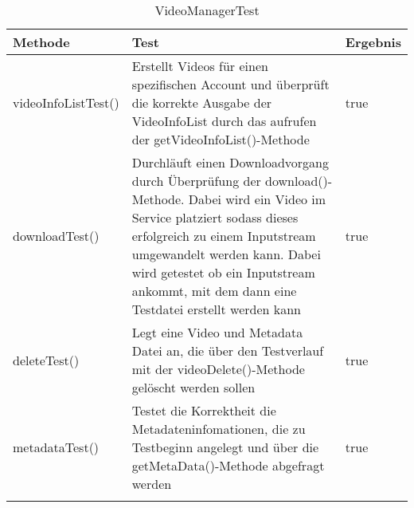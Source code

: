  \begin{longtable}{p{} | p{} | p{}}
\hline
  \textbf{Methode} & \textbf{Test} & \textbf{Ergebnis}\\
  \hline
  videoInfoListTest() & Erstellt Videos für einen spezifischen Account und überprüft die korrekte Ausgabe der VideoInfoList durch das aufrufen der getVideoInfoList()-Methode & true \\
  \hline
  downloadTest() & Durchläuft einen Downloadvorgang durch Überprüfung der download()-Methode. Dabei wird ein Video im Service platziert sodass dieses erfolgreich zu einem Inputstream umgewandelt werden kann. Dabei wird getestet ob ein Inputstream ankommt, mit dem dann eine Testdatei erstellt werden kann & true \\
  \hline
  deleteTest() & Legt eine Video und Metadata Datei an, die über den Testverlauf mit der videoDelete()-Methode gelöscht werden sollen & true \\ 
  \hline
  metadataTest() & Testet die Korrektheit die Metadateninfomationen, die zu Testbeginn angelegt und über die getMetaData()-Methode abgefragt werden & true \\
  \hline
  \caption{VideoManagerTest}
 \end{longtable}
 
